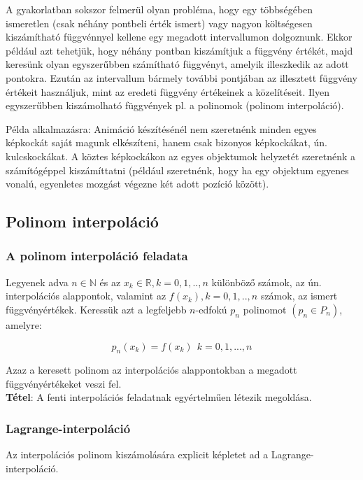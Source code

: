 \documentclass[margin=0px]{article}
\begin{document}
A gyakorlatban sokszor felmerül olyan probléma, hogy egy többségében ismeretlen (csak néhány pontbeli érték ismert)
vagy nagyon költségesen kiszámítható függvénnyel kellene egy megadott intervallumon dolgoznunk.
Ekkor például azt tehetjük, hogy néhány pontban kiszámítjuk	a függvény értékét,
majd keresünk olyan egyszerűbben számítható függvényt, amelyik illeszkedik az
adott pontokra. Ezután az intervallum bármely további pontjában az illesztett függvény értékeit használjuk, mint
az eredeti függvény értékeinek a közelítéseit. Ilyen egyszerűbben kiszámolható függvények pl. a polinomok (polinom interpoláció).

Példa alkalmazásra: Animáció készítésénél nem szeretnénk minden egyes képkockát saját magunk elkészíteni, hanem csak bizonyos képkockákat,
ún. kulcskockákat. A köztes képkockákon az egyes objektumok helyzetét szeretnénk a számítógéppel kiszámíttatni (például szeretnénk, hogy
ha egy objektum egyenes vonalú, egyenletes mozgást végezne két adott pozíció között).

\subsection{Polinom interpoláció}

\subsubsection{A polinom interpoláció feladata}
Legyenek adva $n \in \mathbb{N}$ és az $x_{k} \in \mathbb{R}, k=0,1,..,n$ különböző számok, az ún. interpolációs alappontok, valamint
az $f(x_{k}),k=0,1,..,n$ számok, az ismert függvényértékek. Keressük azt a legfeljebb $n$-edfokú $p_{n}$ polinomot $(p_{n} \in P_{n})$,
amelyre:

\begin{displaymath}
    p_{n}(x_{k}) = f(x_{k}) \ \ k=0,1,...,n
\end{displaymath}

\noindent Azaz a keresett polinom az interpolációs alappontokban a megadott függvényértékeket veszi fel.\\

\noindent \textbf{Tétel}: A fenti interpolációs feladatnak egyértelműen létezik megoldása.\\

\subsubsection{Lagrange-interpoláció}
Az interpolációs polinom kiszámolására explicit képletet ad a Lagrange-interpoláció.\\
\end{document}

